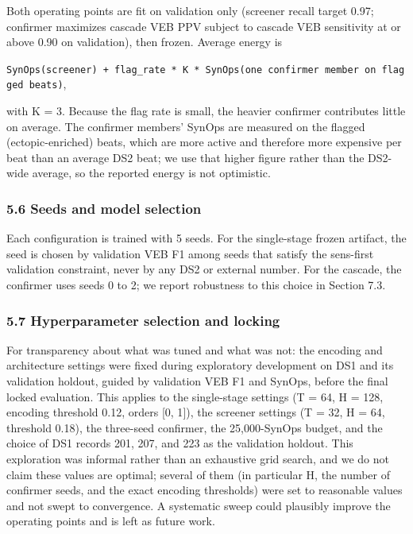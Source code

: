 \documentclass[
]{article}
\begin{document}
Both operating points are fit on validation only (screener recall target
0.97; confirmer maximizes cascade VEB PPV subject to cascade VEB
sensitivity at or above 0.90 on validation), then frozen. Average energy
is

\texttt{SynOps(screener)\ +\ flag\_rate\ *\ K\ *\ SynOps(one\ confirmer\ member\ on\ flagged\ beats)},

with K = 3. Because the flag rate is small, the heavier confirmer
contributes little on average. The confirmer members' SynOps are
measured on the flagged (ectopic-enriched) beats, which are more active
and therefore more expensive per beat than an average DS2 beat; we use
that higher figure rather than the DS2-wide average, so the reported
energy is not optimistic.

\subsubsection{5.6 Seeds and model
selection}\label{seeds-and-model-selection}

Each configuration is trained with 5 seeds. For the single-stage frozen
artifact, the seed is chosen by validation VEB F1 among seeds that
satisfy the sens-first validation constraint, never by any DS2 or
external number. For the cascade, the confirmer uses seeds 0 to 2; we
report robustness to this choice in Section 7.3.

\subsubsection{5.7 Hyperparameter selection and
locking}\label{hyperparameter-selection-and-locking}

For transparency about what was tuned and what was not: the encoding and
architecture settings were fixed during exploratory development on DS1
and its validation holdout, guided by validation VEB F1 and SynOps,
before the final locked evaluation. This applies to the single-stage
settings (T = 64, H = 128, encoding threshold 0.12, orders {[}0, 1{]}),
the screener settings (T = 32, H = 64, threshold 0.18), the three-seed
confirmer, the 25,000-SynOps budget, and the choice of DS1 records 201,
207, and 223 as the validation holdout. This exploration was informal
rather than an exhaustive grid search, and we do not claim these values
are optimal; several of them (in particular H, the number of confirmer
seeds, and the exact encoding thresholds) were set to reasonable values
and not swept to convergence. A systematic sweep could plausibly improve
the operating points and is left as future work.
\end{document}

